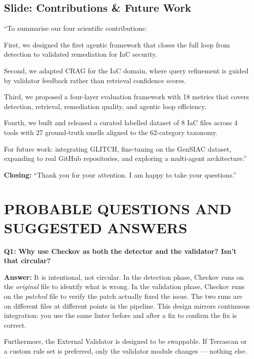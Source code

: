 \documentclass[12pt,a4paper]{article}
\begin{document}
\subsection{Slide: Contributions \& Future Work}

\begin{saybox}
``To summarise our four scientific contributions:

First, we designed the first agentic framework that closes the full loop
from detection to validated remediation for IaC security.

Second, we adapted CRAG for the IaC domain, where query refinement
is guided by validator feedback rather than retrieval confidence scores.

Third, we proposed a four-layer evaluation framework with 18 metrics
that covers detection, retrieval, remediation quality, and agentic loop efficiency.

Fourth, we built and released a curated labelled dataset of 8 IaC files
across 4 tools with 27 ground-truth smells aligned to the 62-category taxonomy.

For future work: integrating GLITCH, fine-tuning on the GenSIAC dataset,
expanding to real GitHub repositories, and exploring a multi-agent architecture.''
\end{saybox}

\begin{saybox}
\textbf{Closing:} ``Thank you for your attention. I am happy to take your questions.''
\end{saybox}

\newpage
\section*{\color{qabrown} PROBABLE QUESTIONS AND SUGGESTED ANSWERS}

\begin{qabox}
\textbf{Q1: Why use Checkov as both the detector and the validator? Isn't that circular?}

\textbf{Answer:} It is intentional, not circular. In the detection phase, Checkov runs on the \textit{original} file to identify what is wrong. In the validation phase, Checkov runs on the \textit{patched} file to verify the patch actually fixed the issue. The two runs are on different files at different points in the pipeline. This design mirrors continuous integration: you use the same linter before and after a fix to confirm the fix is correct.

Furthermore, the External Validator is designed to be swappable. If Terrascan or a custom rule set is preferred, only the validator module changes --- nothing else.
\end{qabox}
\end{document}
